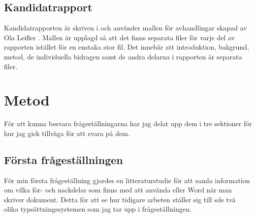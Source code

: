 \subsection{Kandidatrapport}
\label{sec:thesis-info-tuhkala}
Kandidatrapporten är skriven i \latex och använder mallen för avhandlingar skapad av Ola Leifler \cite{thesis_template}. Mallen är upplagd så att det finns separata filer för varje del av rapporten istället för en enstaka stor fil. Det innebär att introduktion, bakgrund, metod, de individuella bidragen samt de andra delarna i rapporten är separata filer.

\section{Metod}
\label{sec:method-tuhkala}
För att kunna besvara frågeställningarna har jag delat upp dem i tre sektioner för hur jag gick tillväga för att svara på dem.

\subsection{Första frågeställningen}
För min första frågeställning gjordes en litteraturstudie för att samla information om vilka för- och nackdelar som finns med att använda \latex eller Word när man skriver dokument. Detta för att se hur tidigare arbeten ställer sig till sde två olika typsättningssystemen som jag tar upp i frågeställningen.

